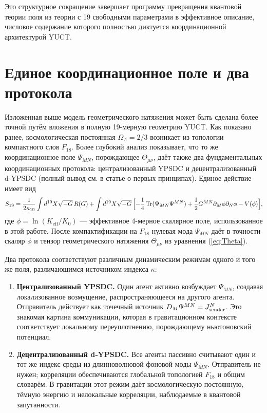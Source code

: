 \documentclass[12pt,a4paper]{article}
\DeclareMathOperator{\Tr}{Tr}
\begin{document}
	Это структурное сокращение завершает программу превращения квантовой теории поля из теории с 19 свободными параметрами в эффективное описание, числовое содержание которого полностью диктуется координационной архитектурой YUCT.
	
	\section{Единое координационное поле и два протокола}
	\label{sec:unified-protocols}
	
	Изложенная выше модель геометрического натяжения может быть сделана более точной путём вложения в полную 19-мерную геометрию YUCT. Как показано ранее, космологическая постоянная \(\Omega_\Lambda=2/3\) возникает из топологии компактного слоя \(F_{18}\). Более глубокий анализ показывает, что то же координационное поле \(\Psi_{MN}\), порождающее \(\Theta_{\mu\nu}\), даёт также два фундаментальных координационных протокола: централизованный YPSDC и децентрализованный d‑YPSDC (полный вывод см. в статье о первых принципах). Единое действие имеет вид
	\begin{equation}
		S_{19} = \frac{1}{2\kappa_{19}} \int d^{19}X \sqrt{-G}\, R(G)
		+ \int d^{19}X \sqrt{-G}\,
		\Bigl[ -\frac14 \Tr(\Psi_{MN}\Psi^{MN})
		+ \frac12 G^{MN}\partial_M\phi \partial_N\phi
		- V(\phi) \Bigr],
		\label{eq:unified-gravity}
	\end{equation}
	где \(\phi = \ln(K_{\mathrm{eff}}/K_0)\) — эффективное 4-мерное скалярное поле, использованное в этой работе. После компактификации на \(F_{18}\) нулевая мода \(\Psi_{MN}\) даёт в точности скаляр \(\phi\) и тензор геометрического натяжения \(\Theta_{\mu\nu}\) из уравнения (\ref{eq:Theta}).
	
	Два протокола соответствуют различным динамическим режимам одного и того же поля, различающимся источником индекса \(\kappa\):
	\begin{enumerate}[leftmargin=*]
		\item \textbf{Централизованный YPSDC.} Один агент активно возбуждает \(\Psi_{MN}\), создавая локализованное возмущение, распространяющееся на другого агента. Отправитель действует как точечный источник \(D_M\Psi^{MN} = J^N_{\rm sender}\). Это знакомая картина коммуникации, которая в гравитационном контексте соответствует локальному переуплотнению, порождающему ньютоновский потенциал.
		\item \textbf{Децентрализованный d‑YPSDC.} Все агенты пассивно считывают один и тот же индекс среды из длинноволновой фоновой моды \(\Psi_{MN}\). Отправитель не нужен; корреляции обеспечиваются глобальной топологией \(F_{18}\) и общим словарём. В гравитации этот режим даёт космологическую постоянную, тёмную энергию и нелокальные корреляции, наблюдаемые в квантовой запутанности.
	\end{enumerate}
	
\end{document}
